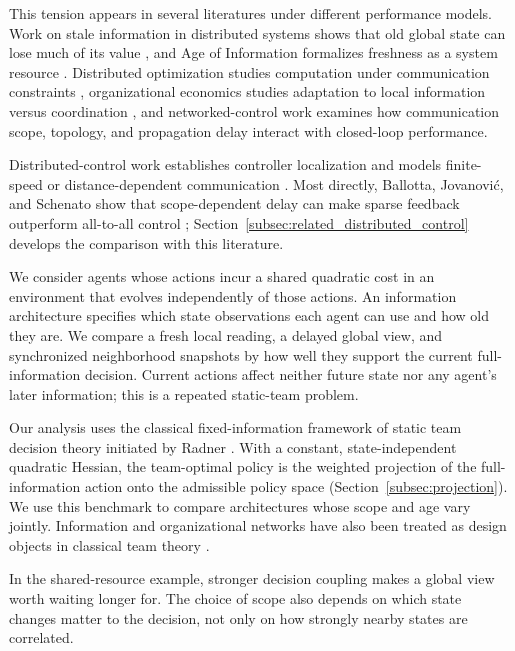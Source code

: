 \documentclass[11pt]{article}
\begin{document}
This tension appears in several literatures under different performance
models. Work on stale information in distributed systems shows that old global
state can lose much of its value \cite{mitzenmacher2000old}, and Age of
Information formalizes freshness as a system resource \cite{kaul2012realtime}.
Distributed optimization studies computation under communication constraints
\cite{nedic2009distributed}, organizational economics studies adaptation to
local information versus coordination \cite{alonso2008coordination}, and
networked-control work examines how communication scope, topology, and
propagation delay interact with closed-loop performance.

Distributed-control work establishes controller localization and models
finite-speed or distance-dependent communication
\cite{bamieh2002spatial,voulgaris2003optimal,bamieh2005convex,
fardad2011finite}. Most directly, Ballotta, Jovanovi\'c, and Schenato show that
scope-dependent delay can make sparse feedback outperform all-to-all control
\cite{ballotta2023latency}; Section~\ref{subsec:related_distributed_control}
develops the comparison with this literature.

We consider agents whose actions incur a shared quadratic cost in an
environment that evolves independently of those actions. An information
architecture specifies which state observations each agent can use and how
old they are. We compare a fresh local reading, a delayed global view, and
synchronized neighborhood snapshots by how well they support the current
full-information decision. Current actions affect neither future state nor
any agent's later information; this is a repeated static-team problem.

Our analysis uses the classical fixed-information framework of static team
decision theory initiated by Radner \cite{radner1962team}. With a constant,
state-independent quadratic Hessian, the team-optimal policy is the weighted
projection of the full-information action onto the admissible policy space
(Section~\ref{subsec:projection}). We use this benchmark to compare architectures
whose scope and age vary jointly. Information and organizational networks have
also been treated as design objects in classical team theory
\cite{marschak1972economic,summers2017information}.

In the shared-resource example, stronger decision coupling makes a global
view worth waiting longer for. The choice of scope also depends on which
state changes matter to the decision, not only on how strongly nearby states
are correlated.
\end{document}
